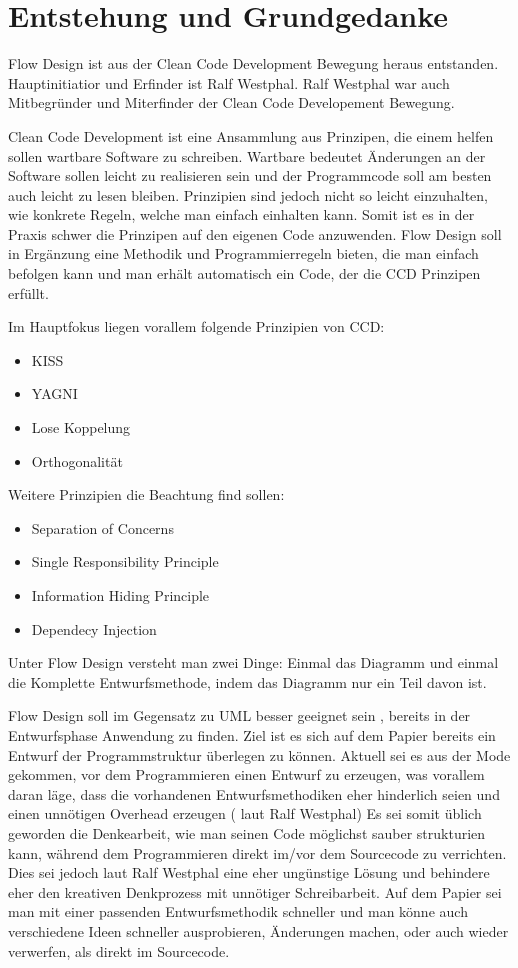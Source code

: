\documentclass[11pt]{article}
\author{Dennis Müller}
\date{\today}
\title{}
\begin{document}
\tableofcontents

\section{Entstehung und Grundgedanke}
\label{sec:orgheadline1}
Flow Design ist aus der Clean Code Development Bewegung heraus entstanden. Hauptinitiatior und Erfinder ist Ralf Westphal.
Ralf Westphal war auch Mitbegründer und Miterfinder der Clean Code Developement Bewegung.


Clean Code Development ist eine Ansammlung aus Prinzipen, die einem helfen sollen wartbare Software zu schreiben.
Wartbare bedeutet Änderungen an der Software sollen leicht zu realisieren sein und der Programmcode soll
am besten auch leicht zu lesen bleiben.
Prinzipien sind jedoch nicht so leicht einzuhalten, wie konkrete Regeln, welche man einfach einhalten kann.
Somit ist es in der Praxis schwer die Prinzipen auf den eigenen Code anzuwenden.
Flow Design soll in Ergänzung eine Methodik und Programmierregeln bieten, die man einfach befolgen kann und man erhält automatisch
ein Code, der die CCD Prinzipen erfüllt.

Im Hauptfokus liegen vorallem folgende Prinzipien von CCD:
\begin{itemize}
\item KISS
\item YAGNI
\item Lose Koppelung
\item Orthogonalität
\end{itemize}

Weitere Prinzipien die Beachtung find sollen:
\begin{itemize}
\item Separation of Concerns
\item Single Responsibility Principle
\item Information Hiding Principle
\item Dependecy Injection
\end{itemize}

Unter Flow Design versteht man zwei Dinge:
Einmal das Diagramm und einmal die Komplette Entwurfsmethode, indem das
Diagramm nur ein Teil davon ist.

Flow Design soll im Gegensatz zu UML besser geeignet sein , bereits in der Entwurfsphase Anwendung zu finden.
Ziel ist es sich auf dem Papier bereits ein Entwurf der Programmstruktur überlegen zu können.
Aktuell sei es aus der Mode gekommen, vor dem Programmieren einen Entwurf zu erzeugen, was vorallem daran läge, dass die vorhandenen
Entwurfsmethodiken eher hinderlich seien und einen unnötigen Overhead erzeugen ( laut Ralf Westphal)
Es sei somit üblich geworden die Denkearbeit, wie man seinen Code möglichst sauber strukturien kann,
während dem Programmieren direkt im/vor dem Sourcecode zu verrichten.
Dies sei jedoch laut Ralf Westphal eine eher ungünstige Lösung und behindere eher den kreativen Denkprozess mit
unnötiger Schreibarbeit.
Auf dem Papier sei man mit einer passenden Entwurfsmethodik schneller und man könne auch verschiedene Ideen schneller
ausprobieren, Änderungen machen, oder auch wieder verwerfen, als direkt im Sourcecode.
\end{document}
